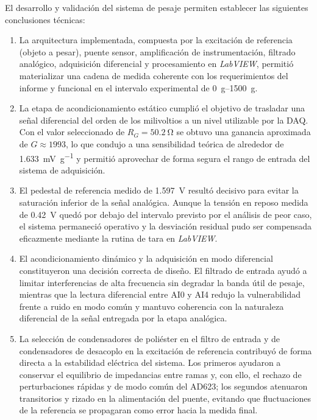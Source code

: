 El desarrollo y validación del sistema de pesaje permiten establecer las siguientes conclusiones técnicas:

\begin{enumerate}
    \item La arquitectura implementada, compuesta por la excitación de referencia (objeto a pesar), puente sensor, amplificación de instrumentación, filtrado analógico, adquisición diferencial y procesamiento en \textit{LabVIEW}, permitió materializar una cadena de medida coherente con los requerimientos del informe y funcional en el intervalo experimental de \SIrange{0}{1500}{\g}.

    \item La etapa de acondicionamiento estático cumplió el objetivo de trasladar una señal diferencial del orden de los milivoltios a un nivel utilizable por la DAQ. Con el valor seleccionado de $R_G=\SI{50.2}{\ohm}$ se obtuvo una ganancia aproximada de $G\approx 1993$, lo que condujo a una sensibilidad teórica de alrededor de \SI{1.633}{\milli\V\per\g} y permitió aprovechar de forma segura el rango de entrada del sistema de adquisición.

    \item El pedestal de referencia medido de \SI{1.597}{\V} resultó decisivo para evitar la saturación inferior de la señal analógica. Aunque la tensión en reposo medida de \SI{0.42}{\V} quedó por debajo del intervalo previsto por el análisis de peor caso, el sistema permaneció operativo y la desviación residual pudo ser compensada eficazmente mediante la rutina de tara en \textit{LabVIEW}.

    \item El acondicionamiento dinámico y la adquisición en modo diferencial constituyeron una decisión correcta de diseño. El filtrado de entrada ayudó a limitar interferencias de alta frecuencia sin degradar la banda útil de pesaje, mientras que la lectura diferencial entre AI0 y AI4 redujo la vulnerabilidad frente a ruido en modo común y mantuvo coherencia con la naturaleza diferencial de la señal entregada por la etapa analógica.

    \item La selección de condensadores de poliéster en el filtro de entrada y de condensadores de desacoplo en la excitación de referencia contribuyó de forma directa a la estabilidad eléctrica del sistema. Los primeros ayudaron a conservar el equilibrio de impedancias entre ramas y, con ello, el rechazo de perturbaciones rápidas y de modo común del AD623; los segundos atenuaron transitorios y rizado en la alimentación del puente, evitando que fluctuaciones de la referencia se propagaran como error hacia la medida final.


\end{enumerate}
